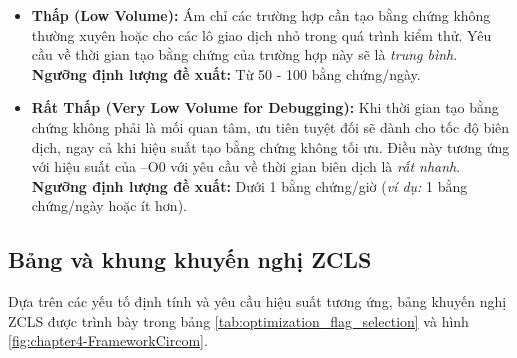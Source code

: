 \begin{enumerate}
\begin{itemize}


    \item \textbf{Thấp (Low Volume):} Ám chỉ các trường hợp cần tạo bằng chứng không thường xuyên hoặc cho các lô giao dịch nhỏ trong quá trình kiểm thử. Yêu cầu về thời gian tạo bằng chứng của trường hợp này sẽ là \textit{trung bình}. \textbf{Ngưỡng định lượng đề xuất:} Từ 50 - 100 bằng chứng/ngày.
    


    \item \textbf{Rất Thấp (Very Low Volume for Debugging):} Khi thời gian tạo bằng chứng không phải là mối quan tâm, ưu tiên tuyệt đối sẽ dành cho tốc độ biên dịch, ngay cả khi hiệu suất tạo bằng chứng không tối ưu. Điều này tương ứng với hiệu suất của --O0 với yêu cầu về thời gian biên dịch là \textit{rất nhanh}. \textbf{Ngưỡng định lượng đề xuất:} Dưới 1 bằng chứng/giờ (\textit{ví dụ:} 1 bằng chứng/ngày hoặc ít hơn).

    \end{itemize}
\end{enumerate}

\subsection{Bảng và khung khuyến nghị ZCLS}
Dựa trên các yếu tố định tính và yêu cầu hiệu suất tương ứng, bảng khuyến nghị ZCLS được trình bày trong bảng \ref{tab:optimization_flag_selection} và hình \ref{fig:chapter4-FrameworkCircom}.

